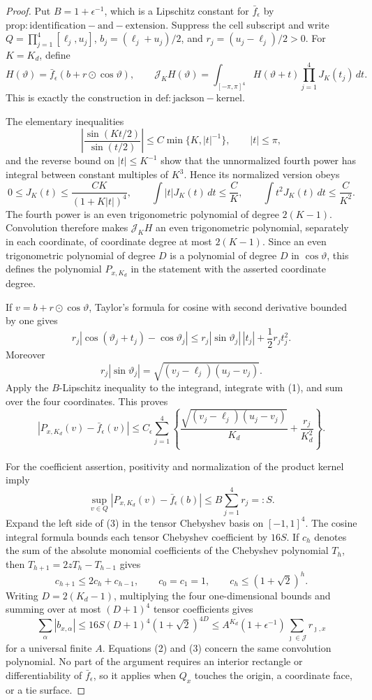 \documentclass{article}
\begin{document}
\begin{proof}
Put \(B=1+\epsilon^{-1}\), which is a Lipschitz constant for \(\bar f_\epsilon\) by \(\mathrm{prop:identification-and-extension}\).  Suppress the cell subscript and write \(Q=\prod_{j=1}^4[\ell_j,u_j]\), \(b_j=(\ell_j+u_j)/2\), and \(r_j=(u_j-\ell_j)/2>0\).  For \(K=K_d\), define
\[
 H(\vartheta)=\bar f_\epsilon(b+r\odot\cos\vartheta),
 \qquad
 \mathcal J_KH(\vartheta)=\int_{[-\pi,\pi]^4}H(\vartheta+t)\prod_{j=1}^4J_K(t_j)\,dt.
\]
This is exactly the construction in \(\mathrm{def:jackson-kernel}\).

The elementary inequalities
\[
 \left|\frac{\sin(Kt/2)}{\sin(t/2)}\right|
 \leq C\min\{K,|t|^{-1}\},
 \qquad |t|\leq\pi,
\]
and the reverse bound on \(|t|\leq K^{-1}\) show that the unnormalized fourth power has integral between constant multiples of \(K^3\).  Hence its normalized version obeys
\[
 0\leq J_K(t)\leq\frac{CK}{(1+K|t|)^4},\qquad
 \int|t|J_K(t)\,dt\leq\frac CK,\qquad
 \int t^2J_K(t)\,dt\leq\frac C{K^2}.                                      \tag{1}
\]
The fourth power is an even trigonometric polynomial of degree \(2(K-1)\).  Convolution therefore makes \(\mathcal J_KH\) an even trigonometric polynomial, separately in each coordinate, of coordinate degree at most \(2(K-1)\).  Since an even trigonometric polynomial of degree \(D\) is a polynomial of degree \(D\) in \(\cos\vartheta\), this defines the polynomial \(P_{x,K_d}\) in the statement with the asserted coordinate degree.

If \(v=b+r\odot\cos\vartheta\), Taylor's formula for cosine with second derivative bounded by one gives
\[
 r_j|\cos(\vartheta_j+t_j)-\cos\vartheta_j|
 \leq r_j|\sin\vartheta_j|\,|t_j|+\frac12r_jt_j^2.
\]
Moreover
\[
 r_j|\sin\vartheta_j|=\sqrt{(v_j-\ell_j)(u_j-v_j)}.
\]
Apply the \(B\)-Lipschitz inequality to the integrand, integrate with (1), and sum over the four coordinates.  This proves
\[
 |P_{x,K_d}(v)-\bar f_\epsilon(v)|
 \leq C_\epsilon\sum_{j=1}^4\left\{
 \frac{\sqrt{(v_j-\ell_j)(u_j-v_j)}}{K_d}+\frac{r_j}{K_d^2}
 \right\}.                                                               \tag{2}
\]

For the coefficient assertion, positivity and normalization of the product kernel imply
\[
 \sup_{v\in Q}|P_{x,K_d}(v)-\bar f_\epsilon(b)|
 \leq B\sum_{j=1}^4r_j=:S.                                               \tag{3}
\]
Expand the left side of (3) in the tensor Chebyshev basis on \([-1,1]^4\).  The cosine integral formula bounds each tensor Chebyshev coefficient by \(16S\).  If \(c_h\) denotes the sum of the absolute monomial coefficients of the Chebyshev polynomial \(T_h\), then \(T_{h+1}=2zT_h-T_{h-1}\) gives
\[
 c_{h+1}\leq2c_h+c_{h-1},\qquad c_0=c_1=1,\qquad
 c_h\leq(1+\sqrt2)^h.
\]
Writing \(D=2(K_d-1)\), multiplying the four one-dimensional bounds and summing over at most \((D+1)^4\) tensor coefficients gives
\[
 \sum_\alpha|b_{x,\alpha}|
 \leq16S(D+1)^4(1+\sqrt2)^{4D}
 \leq A^{K_d}(1+\epsilon^{-1})\sum_{\jmath\in\mathcal J}r_{\jmath,x}
\]
for a universal finite \(A\).  Equations (2) and (3) concern the same convolution polynomial.  No part of the argument requires an interior rectangle or differentiability of \(\bar f_\epsilon\), so it applies when \(Q_x\) touches the origin, a coordinate face, or a tie surface.
\end{proof}
\end{document}
